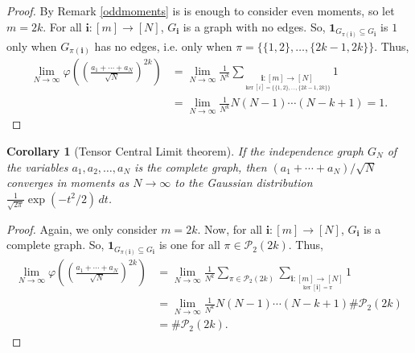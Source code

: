 \documentclass[a4paper,12pt]{extarticle}
\newtheorem{cor}[thm]{Corollary}
\theoremstyle{definition}
\theoremstyle{remark}
\begin{document}
\begin{proof}
	By Remark \ref{oddmoments} is is enough to consider even moments, so let $m=2k$. For all $\bm{i}:[m]\to [N]$, $G_{\mathbf{i}}$ is a graph with no edges. So,  $\mathbf{1}_{G_{\pi(\bm{i})} \subseteq G_{\bm{i}}}$ is $1$ only  when $G_{\pi(\bm{i})}$ has no edges, i.e. only when $\pi=\{\{1,2\},\ldots, \{2k-1,2k\}\}$. Thus,
	\begin{align*}
		\lim_{N\to \infty}\varphi\left( \left(\frac{a_1+\cdots+a_N}{\sqrt{N}} \right)^{2k} \right)&=\lim_{N\to \infty}\frac{1}{N^{k}} \sum\limits_{\underset{\ker[i]=\{\{1,2\},\ldots, \{2k-1,2k\}\}}{\bm{i}: [m] \to [N]}} 1\\
		&=\lim_{N\to \infty}\frac{1}{N^{k}} N(N-1)\cdots (N-k+1)=1.
	\end{align*}
\end{proof}


\begin{cor}[Tensor Central Limit theorem]\label{cor_tensor_ctl}
	If the independence graph $G_N$ of the variables $a_1,a_2,\ldots,a_N$ is the complete graph,  then $(a_1 + \cdots + a_N)/\sqrt{N}$ converges in moments as $N \to \infty$ to the Gaussian distribution $\frac{1}{\sqrt{2 \pi}}  \exp(-t^2 / 2 )  \, dt$. 
\end{cor}
\begin{proof}
Again, we only consider $m=2k$.  Now, for all $\bm{i}:[m]\to [N]$, $G_{\mathbf{i}}$ is a complete graph. So,  $\mathbf{1}_{G_{\pi(\bm{i})} \subseteq G_{\mathbf{i}}}$ is one for all $\pi \in \mathcal{P}_2(2k)$. Thus,
	\begin{align*}
		\lim_{N\to \infty}\varphi\left( \left(\frac{a_1+\cdots+a_N}{\sqrt{N}} \right)^{2k} \right)&=\lim_{N\to \infty}\frac{1}{N^{k}}\sum\limits_{\pi \in \mathcal{P}_2(2k)} \sum\limits_{\underset{\ker[\bm{i}]=\pi}{\bm{i}:[m]\to [N]}} 1\\
		&=\lim_{N\to \infty}\frac{1}{N^{k}} N(N-1)\cdots (N-k+1) \# \mathcal{P}_2(2k)\\
		&=\# \mathcal{P}_2(2k).
	\end{align*}
\end{proof}
\end{document}

